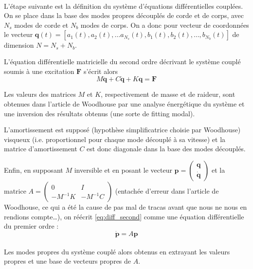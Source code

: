   \paragraph{}
  L'étape suivante est la définition du système d'équations différentielles
cou\-plées. On se place dans la base des modes propres découplés de corde et de corps,
avec \( N_s \) modes de corde et \( N_b \) modes de corps. On a donc
pour vecteur de coordonnées le vecteur
  \( \bm{q}(t) = [a_1(t), a_2(t), \dots a_{N_s}(t),
    b_1(t), b_2(t), \dots, b_{N_b}(t)] \) de dimension
\( N = N_s + N_b \).

  L'équation différentielle matricielle du second ordre décrivant le système
couplé soumis à une excitation \( \bm{F} \) s'écrit alors
  \[ \label{eq:diff_second}
    M \ddot{\bm{q}} + C \dot{\bm{q}} + K \bm{q} = \bm{F} \]

  Les valeurs des matrices \( M \) et \( K \), respectivement de masse et de
raideur, sont obtenues dans l'article de Woodhouse par une analyse énergétique
du système et une inversion des résultats obtenus (une sorte de fitting
modal).

  L'amortissement est supposé (hypothèse simplificatrice choisie par Woodhouse)
visqueux (i.e. proportionnel pour chaque mode découplé à sa vitesse) et la
matrice d'amortissement \( C \) est donc diagonale dans la base des
modes découplés.

  Enfin, en supposant \( M \) inversible et en posant le vecteur
\( \bm{p} = \begin{pmatrix} \bm{q} \\ \bm{\dot{q}} \end{pmatrix} \) et la
matrice \( A = \begin{pmatrix} 0 & I \\ -M^{-1}K & -M^{-1}C \end{pmatrix} \)
(entachée d'erreur dans l'article de Woodhouse, ce qui a été la cause de pas
mal de tracas avant que nous ne nous en rendions compte\dots), on réécrit
\ref{eq:diff_second} comme une équation différentielle du premier ordre :
\[ \bm{\dot{p}} = A\bm{p} \]

\paragraph{}
  Les modes propres du système couplé alors obtenus en extrayant les valeurs
propres et une base de vecteurs propres de \( A \).

